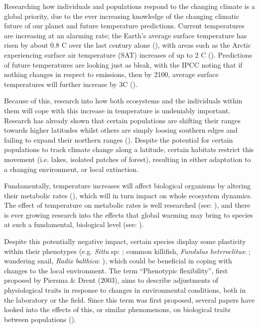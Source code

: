 \documentclass[../../Paper.tex]{subfiles}
\begin{document}
Researching how individuals and populations respond to the changing climate is a global priority,
due to the ever increasing knowledge of the changing climatic future of our planet 
and future temperature predictions. Current temperatures are 
increasing at an alarming rate; the Earth's average surface temperature has risen
by about 0.8 \degree C over the last century alone (\cite{ipcc_climate_2014}),
with areas such as the Arctic experiencing surface air temperature (SAT)
increases of up to 2 \degree C (\cite{przybylak_recent_2007}). Predictions 
of future temperatures are looking just as bleak, with the IPCC noting 
that if nothing changes in respect to emissions, then by 2100, average surface
temperatures will further increase by 3\degree C (\cite{ipcc_climate_2014}).

Because of this, research into how both ecosystems and the individuals
within them will cope with this increase in temperature is undeniably 
important. Research has already shown that certain populations are 
shifting their ranges towards higher latitudes whilst others
 are simply loosing southern edges and failing to expand their northern ranges
(\cite{chen_rapid_2011, sunday_thermal-safety_2014, kerr_climate_2015}). Despite 
the potential for certain populations to track climate change along a latitude,
certain habitats restrict this movement (i.e. lakes, isolated patches of forest),
resulting in either adaptation to a changing environment, or local extinction.

Fundamentally, temperature increases will affect biological organisms by altering
their metabolic rates (\cite{gillooly_effects_2001}), which  will in turn impact 
on whole ecosystem dynamics. The effect of temperature
on metabolic rates is well researched (see: \cite{brown_toward_2004,price_metabolic_2010}), 
and there is  ever growing research into the effects that global warming may bring to species at
such a fundamental, biological level (see: \cite{clusella-trullas_climatic_2011,manciocco_global_2014,gandar_adaptive_2017}).

Despite this potentially negative impact, certain species display some plasticity within their
phenotypes (e.g. \textit{Sitta} sp: \cite{ghalambor_comparative_2002}; common killifish,
\textit{Fundulus heteroclitus}: \cite{schulte_thermal_2011};
wandering snail, \textit{Radix balthica}: \cite{ahlgren_camouflaged_2013}),
which could be beneficial in coping with changes to the local environment. The term 
``Phenotypic flexibility'', first proposed by Piersma \& Drent (2003), aims to describe
adjustments of physiological traits in response to changes in environmental conditions, 
both in the laboratory or the field. Since this term was first proposed, several papers
have looked into the effects of this, or similar phenomenons, on biological traits between populations 
(\cite{mckechnie_phenotypic_2008,marshall_warming_2011,ahlgren_camouflaged_2013}).
\end{document}
